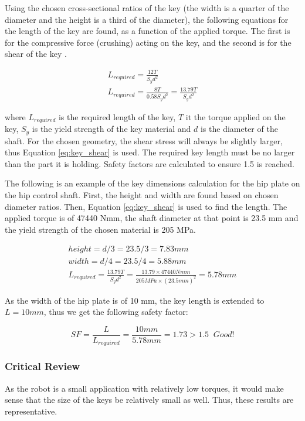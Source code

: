 Using the chosen cross-sectional ratios of the key (the width is a quarter of the diameter and the height is a third of the diameter), the following equations for the length of the key are found, as a function of the applied torque. The first is for the compressive force (crushing) acting on the key, and the second is for the shear of the key \cite{juvinall_fundamentals_2012}.

\begin{gather}
    L_{required}=\frac{12T}{S_yd^2} \label{eq:key_compression}
    \\
    L_{required}=\frac{8T}{0.58S_yd^2}=\frac{13.79T}{S_yd^2} \label{eq:key_shear}
\end{gather}

where $L_{required}$ is the required length of the key, $T$ it the torque applied on the key, $S_y$ is the yield strength of the key material and $d$ is the diameter of the shaft.
For the chosen geometry, the shear stress will always be slightly larger, thus Equation \ref{eq:key_shear} is used. The required key length must be no larger than the part it is holding. Safety factors are calculated to ensure 1.5 is reached.

The following is an example of the key dimensions calculation for the hip plate on the hip control shaft. First, the height and width are found based on chosen diameter ratios. Then, Equation \ref{eq:key_shear} is used to find the length. The applied torque is of 47440 Nmm, the shaft diameter at that point is 23.5 mm and the yield strength of the chosen material is 205 MPa. 

\begin{gather}
    height = d/3 = 23.5/3 =  7.83 mm
    \\
    width = d/4 = 23.5/4 = 5.88 mm
    \\
    L_{required}=\frac{13.79T}{S_yd^2}=\frac{13.79\times 47440 Nmm}{205 MPa\times (23.5 mm)^2}=5.78 mm
\end{gather}

As the width of the hip plate is of 10 mm, the key length is extended to $L=10mm$, thus we get the following safety factor:

\begin{equation}
    SF=\frac{L}{L_{required}}=\frac{10mm}{5.78mm}=1.73 > 1.5  \;\; Good!
\end{equation}

\subsubsection{Critical Review}
As the robot is a small application with relatively low torques, it would make sense that the size of the keys be relatively small as well. Thus, these results are representative.

